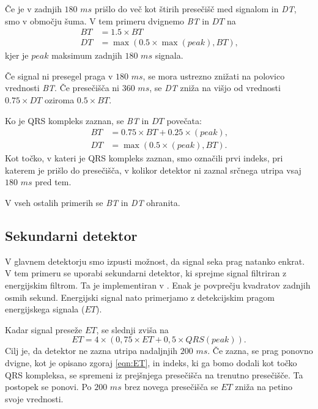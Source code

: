 \documentclass{article}
\begin{document}
    Če je v zadnjih $180$ $ms$ prišlo do več kot štirih presečišč med signalom in \emph{DT}, smo v območju šuma. V tem primeru 
    dvignemo \emph{BT} in $DT$ na 
    \begin{align*}
        BT &= 1.5 \times BT \\
        DT &= \max(0.5 \times \max(peak), BT) \text{,}
    \end{align*}
    kjer je $peak$ maksimum zadnjih $180$ $ms$ signala. 

    Če signal ni presegel praga v $180$ $ms$, se mora ustrezno znižati na polovico vrednosti \emph{BT}. Če presečišča ni $360$ $ms$,
    se \emph{DT} zniža na višjo od vrednosti $0.75 \times DT$ oziroma $0.5 \times BT$.

    Ko je QRS kompleks zaznan, se \emph{BT} in $DT$ povečata:
    \begin{align*}
        BT &= 0.75 \times BT + 0.25 \times (peak) \text{,} \\
        DT &= \max(0.5 \times (peak), BT) \text{.}
    \end{align*}
    Kot točko, v kateri je QRS kompleks zaznan, smo označili prvi indeks, pri katerem
    je prišlo do presečišča, v kolikor detektor ni zaznal srčnega utripa vsaj $180$ $ms$ pred tem.

    V vseh ostalih primerih se \emph{BT} in \emph{DT} ohranita.

    \subsection{Sekundarni detektor}
    V glavnem detektorju smo izpusti možnost, da signal seka prag natanko enkrat. V tem primeru se uporabi sekundarni detektor, ki sprejme 
    signal filtriran z energijskim filtrom. Ta je implementiran v . Enak je povprečju 
    kvadratov zadnjih osmih sekund. Energijski signal nato primerjamo z detekcijskim pragom energijskega signala ($ET$).
    
    Kadar signal preseže $ET$, se slednji zviša na
    \begin{equation}
        \label{eqn:ET}
        ET = 4 \times ( 0,75 \times ET + 0,5 \times QRS (peak)) \text{.}
    \end{equation}
    Cilj je, da detektor ne zazna utripa nadaljnjih $200$ $ms$. Če zazna, se prag ponovno dvigne, kot je opisano 
    zgoraj \ref{eqn:ET}, in indeks, ki ga bomo dodali kot točko QRS kompleksa, se spremeni iz prejšnjega presečišča 
    na trenutno presečišče. Ta postopek se ponovi. Po $200$ $ms$ brez novega presečišča se $ET$ zniža na petino svoje 
    vrednosti.
    
\end{document}
